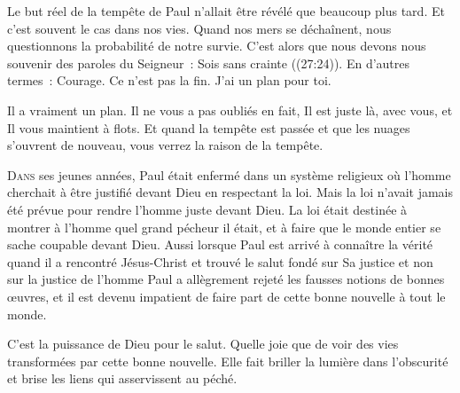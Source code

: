 Le but réel de la tempête de Paul n'allait être révélé que beaucoup plus tard.
 Et c'est souvent le cas dans nos vies. Quand nos mers se déchaînent,
 nous questionnons la probabilité de notre survie.
 C'est alors que nous devons nous souvenir des paroles du Seigneur~:
 \Og Sois sans crainte \Fg{} ((27:24)).
 En d'autres termes~: 
 \Og Courage. Ce n'est pas la fin. J'ai un plan pour toi. \Fg{}

Il a vraiment un plan. Il ne vous a pas oubliés \ocadr en fait,
 Il est juste là, avec vous, et Il vous maintient à flots.
 Et quand la tempête est passée et que les nuages s'ouvrent de nouveau,
 vous verrez la raison de la tempête.

\dvrule






\lettrine{D}{ans} ses jeunes années, Paul était enfermé
 dans un système religieux où l'homme cherchait à être justifié
 devant Dieu en respectant la loi. 
 Mais la loi  n'avait jamais été prévue pour rendre
 l'homme juste devant Dieu. La loi était destinée à montrer
 à l'homme quel grand pécheur il était, et à faire que le monde entier
 se sache coupable devant Dieu. Aussi lorsque Paul est arrivé
 à connaître la vérité \ocadr quand il a rencontré Jésus-Christ
 et trouvé le salut fondé sur Sa justice et non sur la justice
 de l'homme \fcadr{} Paul a allègrement rejeté les fausses notions
 de bonnes \oe{}uvres, et il est devenu impatient de faire part
 de cette bonne nouvelle à tout le monde.


\Og C'est la puissance de Dieu pour le salut. \Fg{}
 Quelle joie que de voir des vies transformées par cette bonne nouvelle.
 Elle fait briller la lumière dans l'obscurité et brise les liens
 qui asservissent au péché.


